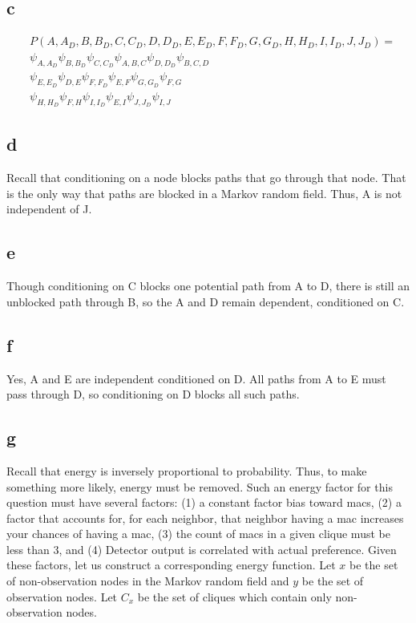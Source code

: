 \documentclass{article}
\begin{document}
\subsection{c}

\begin{align*}
& P(A, A_D, B, B_D, C, C_D, D, D_D, E, E_D, F, F_D, G, G_D, H, H_D, I, I_D, J, J_D) = \\
& \psi_{A, A_D} \psi_{B, B_D} \psi_{C, C_D} \psi_{A, B, C} \psi_{D, D_D} \psi_{B, C, D} \\
& \psi_{E, E_D} \psi_{D, E} \psi_{F, F_D} \psi_{E, F} \psi_{G, G_D} \psi_{F, G} \\
& \psi_{H, H_D} \psi_{F, H} \psi_{I, I_D} \psi_{E, I} \psi_{J, J_D} \psi_{I, J}
\end{align*}

\subsection{d}

Recall that conditioning on a node blocks paths that go through that node. That is 
the only way that paths are blocked in a Markov random field. Thus, A is not 
independent of J.

\subsection{e}

Though conditioning on C blocks one potential path from A to D, there is still 
an unblocked path through B, so the A and D remain dependent, conditioned on C.

\subsection{f}

Yes, A and E are independent conditioned on D. All paths from A to E must pass 
through D, so conditioning on D blocks all such paths.

\subsection{g}

Recall that energy is inversely proportional to probability. Thus, to make 
something more likely, energy must be removed. Such an energy factor for this 
question must have several factors: (1) a constant factor bias toward macs, (2) 
a factor that accounts for, for each neighbor, that neighbor having a mac 
increases your chances of having a mac, (3) the count of macs in a given clique 
must be less than 3, and (4) Detector output is correlated with actual 
preference. Given these factors, let us construct a corresponding energy function. 
Let $x$ be the set of non-observation nodes in the Markov random field and $y$ 
be the set of observation nodes. Let $ C_x $ be the set of cliques which 
contain only non-observation nodes.
\end{document}
